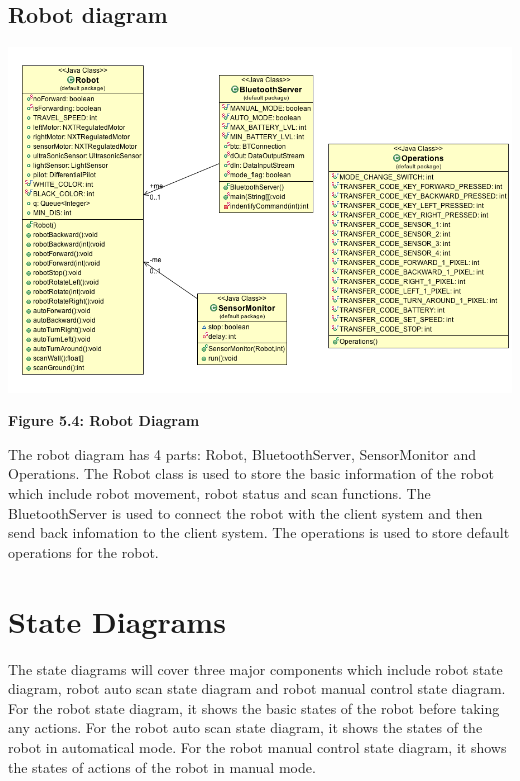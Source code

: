 \documentclass[11pt, a4paper]{report}
\begin{document}
\subsection{Robot diagram}
 \begin{center}
 \includegraphics[width=18.20cm]{Robot.png}
\end{center}
\begin{center}
\textbf {Figure 5.4: Robot Diagram} \\[0.3cm]
\end{center}
The robot diagram has 4 parts: Robot, BluetoothServer, SensorMonitor and Operations. The Robot class is used to store the basic information of the robot which include robot movement, robot status and scan functions. The BluetoothServer is used to connect the robot with the client system and then send back infomation to the client system. The operations is used to store default operations for the robot. 
\pagebreak

\section{State Diagrams}
The state diagrams will cover three major components which include robot state diagram, robot auto scan state diagram and  robot manual control state diagram. For the robot state diagram, it shows the basic states of the robot before taking any actions. For the robot auto scan state diagram, it shows the states of the robot in automatical mode. For the robot manual control state diagram, it shows the states of actions of the robot in manual mode.
\end{document}

